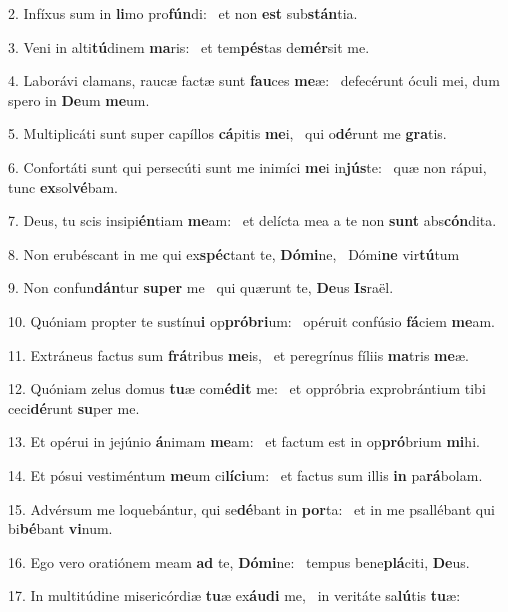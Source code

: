 2. Infíxus sum in \textbf{li}mo pro\textbf{fún}di: \ast\  et non \textbf{est} sub\textbf{stán}tia.\

3. Veni in alti\textbf{tú}dinem \textbf{ma}ris: \ast\  et tem\textbf{pés}tas de\textbf{mér}sit me.\

4. Laborávi clamans, raucæ factæ sunt \textbf{fau}ces \textbf{me}æ: \ast\  defecérunt óculi mei, dum spero in \textbf{De}um \textbf{me}um.\

5. Multiplicáti sunt super capíllos \textbf{cá}pitis \textbf{me}i, \ast\  qui o\textbf{dé}runt me \textbf{gra}tis.\

6. Confortáti sunt qui persecúti sunt me inimíci \textbf{me}i in\textbf{jús}te: \ast\  quæ non rápui, tunc \textbf{ex}sol\textbf{vé}bam.\

7. Deus, tu scis insipi\textbf{én}tiam \textbf{me}am: \ast\  et delícta mea a te non \textbf{sunt} abs\textbf{cón}dita.\

8. Non erubéscant in me qui ex\textbf{spéc}tant te, \textbf{Dó}\textbf{mi}ne, \ast\  Dómi\textbf{ne} vir\textbf{tú}tum\

9. Non confun\textbf{dán}tur \textbf{su}\textbf{per} me \ast\  qui quærunt te, \textbf{De}us \textbf{Is}raël.\

10. Quóniam propter te sustínu\textbf{i} op\textbf{pró}\textbf{bri}um: \ast\  opéruit confúsio \textbf{fá}ciem \textbf{me}am.\

11. Extráneus factus sum \textbf{frá}tribus \textbf{me}is, \ast\  et peregrínus fíliis \textbf{ma}tris \textbf{me}æ.\

12. Quóniam zelus domus \textbf{tu}æ com\textbf{é}\textbf{dit} me: \ast\  et oppróbria exprobrántium tibi ceci\textbf{dé}runt \textbf{su}per me.\

13. Et opérui in jejúnio \textbf{á}nimam \textbf{me}am: \ast\  et factum est in op\textbf{pró}brium \textbf{mi}hi.\

14. Et pósui vestiméntum \textbf{me}um ci\textbf{lí}\textbf{ci}um: \ast\  et factus sum illis \textbf{in} pa\textbf{rá}bolam.\

15. Advérsum me loquebántur, qui se\textbf{dé}bant in \textbf{por}ta: \ast\  et in me psallébant qui bi\textbf{bé}bant \textbf{vi}num.\

16. Ego vero oratiónem meam \textbf{ad} te, \textbf{Dó}\textbf{mi}ne: \ast\  tempus bene\textbf{plá}citi, \textbf{De}us.\

17. In multitúdine misericórdiæ \textbf{tu}æ ex\textbf{áu}\textbf{di} me, \ast\  in veritáte sa\textbf{lú}tis \textbf{tu}æ:\

